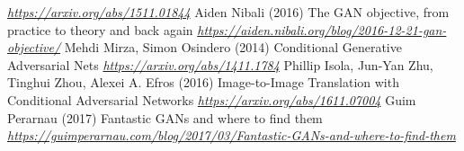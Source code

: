 \begin{vbframe}
{\begin{thebibliography}{99}
\newblock \emph{\url{https://arxiv.org/abs/1511.01844}}
 Aiden Nibali (2016)
\newblock The GAN objective, from practice to theory and back again
\newblock \emph{\url{https://aiden.nibali.org/blog/2016-12-21-gan-objective/}}
 Mehdi Mirza, Simon Osindero (2014)
\newblock Conditional Generative Adversarial Nets
\newblock \emph{\url{https://arxiv.org/abs/1411.1784}}
 Phillip Isola, Jun-Yan Zhu, Tinghui Zhou, Alexei A. Efros (2016)
\newblock Image-to-Image Translation with Conditional Adversarial Networks
\newblock \emph{\url{https://arxiv.org/abs/1611.07004}}
 Guim Perarnau (2017)
\newblock Fantastic GANs and where to find them
\newblock \emph{\url{https://guimperarnau.com/blog/2017/03/Fantastic-GANs-and-where-to-find-them}}


\end{thebibliography}
}
\end{vbframe}

\endlecture
